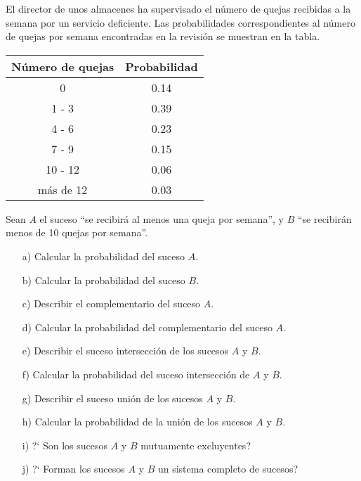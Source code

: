 \documentclass[12pt]{article}
\begin{document}
\probl %
    El director de unos almacenes ha supervisado el n\'umero de quejas
    recibidas a la semana por un servicio deficiente. Las probabilidades
    co\-rres\-pon\-dien\-tes al n\'umero de quejas por semana encontradas en
    la revisi\'on se muestran en la tabla.
    \begin{center}
        \begin{tabular}{|c|c|}
            \hline
            N\'umero de quejas & Probabilidad   \\
            \hline
            \hline
            0             &    0.14    \\
            1 - 3         &    0.39    \\
            4 - 6         &    0.23    \\
            7 - 9         &    0.15    \\
            10 - 12       &    0.06    \\
            m\'as de 12   &    0.03    \\
            \hline
        \end{tabular}
    \end{center}
    Sean $A$ el suceso ``se recibir\'a al menos una queja por semana'', y
    $B$ ``se recibir\'an menos de 10 quejas por semana''.
    \begin{itemize}
        \item [a)] Calcular la probabilidad del suceso $A$.

        \item [b)] Calcular la probabilidad del suceso $B$.

        \item [c)] Describir el complementario del suceso $A$.

        \item [d)] Calcular la probabilidad del complementario del suceso
        $A$.

        \item [e)] Describir el suceso intersecci\'on de los sucesos $A$ y
        $B$.

        \item [f)] Calcular la probabilidad del suceso intersecci\'on de $A$
    y $B$.

        \item [g)] Describir el suceso uni\'on de los sucesos $A$ y $B$.

        \item [h)] Calcular la probabilidad de la uni\'on de los sucesos $A$
    y $B$.

        \item [i)] ?` Son los sucesos $A$ y $B$ mutuamente excluyentes?

        \item [j)] ?` Forman los sucesos $A$ y $B$ un sistema completo de
    sucesos?
    \end{itemize}
\end{document}
